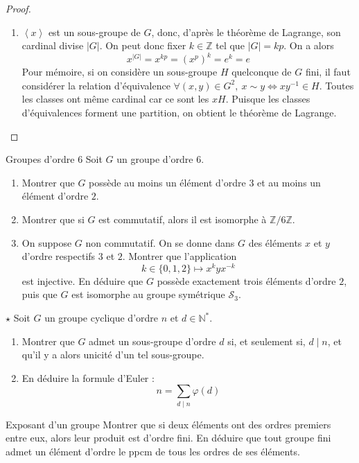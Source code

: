 \documentclass[french,a4paper]{article}
\newcommand{\N}{\mathbb{N}}
\newcommand{\Z}{\mathbb{Z}}
\newcommand{\st}{^*}
\newcommand{\inv}{^{-1}}
\theoremstyle{plain}
\theoremstyle{definition}
\theoremstyle{remark}
\begin{document}
\begin{proof}
\begin{enumerate}
		\item $\left\langle x\right\rangle$ est un sous-groupe de $G$, donc, d'après le théorème de Lagrange, son cardinal divise $|G|$. On peut donc fixer $k\in\Z$ tel que $|G|=kp$. On a alors $$x^{|G|}=x^{kp}=(x^p)^k=e^k=e$$ Pour mémoire, si on considère un sous-groupe $H$ quelconque de $G$ fini, il faut considérer la relation d'équivalence $\forall(x,y)\in G^2, \ x\sim y \Longleftrightarrow xy\inv \in H$. Toutes les classes ont même cardinal car ce sont les $xH$. Puisque les classes d'équivalences forment une partition, on obtient le théorème de Lagrange.
	\end{enumerate}
\end{proof}

\begin{ex}[Moulin.AG.21]{Groupes d'ordre 6}
	Soit $G$ un groupe d'ordre $6$.
	\begin{enumerate}
		\item Montrer que $G$ possède au moins un élément d'ordre $3$ et au moins un élément d'ordre $2$.
		\item Montrer que si $G$ est commutatif, alors il est isomorphe à $\Z/6\Z$.
		\item On suppose $G$ non commutatif. On se donne dans $G$ des éléments $x$ et $y$ d'ordre respectifs $3$ et $2$. Montrer que l'application $$k\in\{0,1,2\}\mapsto x^kyx^{-k}$$ est injective. En déduire que $G$ possède exactement trois éléments d'ordre $2$, puis que $G$ est isomorphe au groupe symétrique $\mathcal{S}_3$.
	\end{enumerate}
\end{ex}

\begin{ex}[Moulin.AG.22]{$\star$}
	Soit $G$ un groupe cyclique d'ordre $n$ et $d\in\N\st$.
	\begin{enumerate}
		\item Montrer que $G$ admet un sous-groupe d'ordre $d$ si, et seulement si, $d\mid n$, et qu'il y a alors unicité d'un tel sous-groupe.
		\item En déduire la formule d'Euler : $$n=\sum_{d\mid n}\varphi(d)$$
	\end{enumerate}
\end{ex}

\begin{ex}{Exposant d'un groupe}
	Montrer que si deux éléments ont des ordres premiers entre eux, alors leur produit est d'ordre fini. En déduire que tout groupe fini admet un élément d'ordre le ppcm de tous les ordres de ses éléments.
\end{ex}
\end{document}
